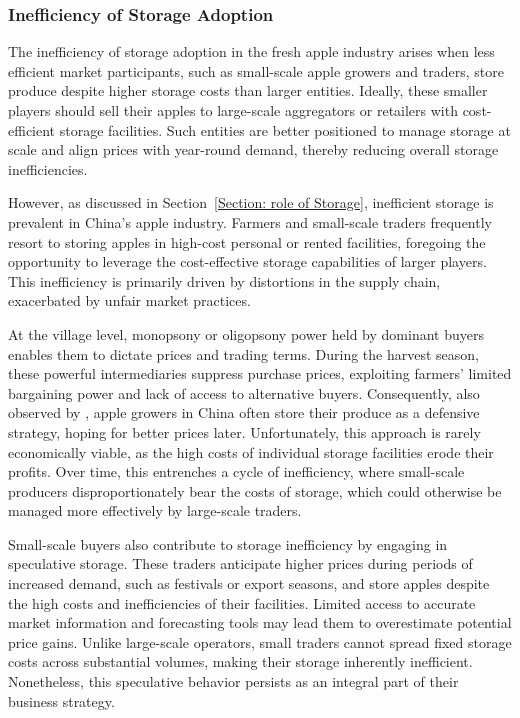 \subsubsection{Inefficiency of Storage Adoption}
\noindent The inefficiency of storage adoption in the fresh apple industry arises when less efficient market participants, such as small-scale apple growers and traders, store produce despite higher storage costs than larger entities. Ideally, these smaller players should sell their apples to large-scale aggregators or retailers with cost-efficient storage facilities. Such entities are better positioned to manage storage at scale and align prices with year-round demand, thereby reducing overall storage inefficiencies.

However, as discussed in Section~\ref{Section: role of Storage}, inefficient storage is prevalent in China's apple industry. Farmers and small-scale traders frequently resort to storing apples in high-cost personal or rented facilities, foregoing the opportunity to leverage the cost-effective storage capabilities of larger players. This inefficiency is primarily driven by distortions in the supply chain, exacerbated by unfair market practices.

At the village level, monopsony or oligopsony power held by dominant buyers enables them to dictate prices and trading terms. During the harvest season, these powerful intermediaries suppress purchase prices, exploiting farmers’ limited bargaining power and lack of access to alternative buyers. Consequently, also observed by \cite{jin2024losses}, apple growers in China often store their produce as a defensive strategy, hoping for better prices later. Unfortunately, this approach is rarely economically viable, as the high costs of individual storage facilities erode their profits. Over time, this entrenches a cycle of inefficiency, where small-scale producers disproportionately bear the costs of storage, which could otherwise be managed more effectively by large-scale traders.

Small-scale buyers also contribute to storage inefficiency by engaging in speculative storage. These traders anticipate higher prices during periods of increased demand, such as festivals or export seasons, and store apples despite the high costs and inefficiencies of their facilities. Limited access to accurate market information and forecasting tools may lead them to overestimate potential price gains. Unlike large-scale operators, small traders cannot spread fixed storage costs across substantial volumes, making their storage inherently inefficient. Nonetheless, this speculative behavior persists as an integral part of their business strategy.

